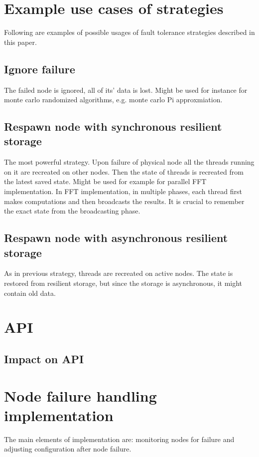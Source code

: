 \documentclass{llncs}
\begin{document}
\section{Example use cases of strategies}
Following are examples of possible usages of fault tolerance strategies described in this paper.
\subsection{Ignore failure}
The failed node is ignored, all of its' data is lost.
Might be used for instance for monte carlo randomized algorithms, e.g. monte carlo Pi approxmiation.
\subsection{Respawn node with synchronous resilient storage}
The most powerful strategy. Upon failure of physical node all the threads running on it are recreated on other nodes.
Then the state of threads is recreated from the latest saved state.
Might be used for example for parallel FFT implementation.
In FFT implementation, in multiple phases, each thread first makes computations and then broadcasts the results.
It is crucial to remember the exact state from the broadcasting phase.
\subsection{Respawn node with asynchronous resilient storage}
As in previous strategy, threads are recreated on active nodes.
The state is restored from resilient storage, but since the storage is asynchronous, it might contain old data.

\section{API}

\subsection{Impact on API}

\section{Node failure handling implementation}

The main elements of implementation are: monitoring nodes for failure and adjusting configuration after node failure.
\end{document}
